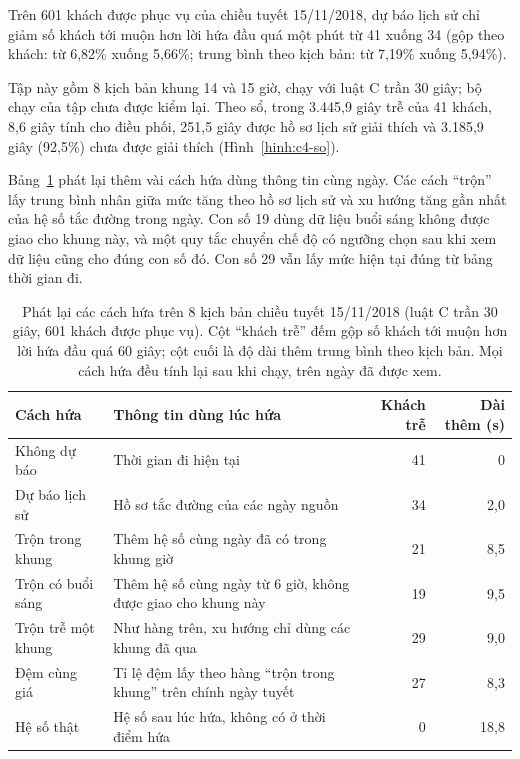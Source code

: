 Trên 601 khách được phục vụ của chiều tuyết 15/11/2018, dự báo lịch sử chỉ giảm số khách tới muộn hơn lời hứa đầu
quá một phút từ 41 xuống 34 (gộp theo khách: từ 6,82\% xuống 5,66\%; trung bình theo kịch bản: từ 7,19\% xuống
5,94\%).

Tập này gồm 8 kịch bản khung 14 và 15 giờ, chạy với luật C trần 30 giây; bộ chạy của tập chưa được kiểm lại. Theo
sổ, trong 3.445,9 giây trễ của 41 khách, 8,6 giây tính cho điều phối, 251,5 giây được hồ sơ lịch sử giải thích và
3.185,9 giây (92,5\%) chưa được giải thích (Hình~\ref{hinh:c4-so}).

Bảng~\ref{bang:c4-tuyet} phát lại thêm vài cách hứa dùng thông tin cùng ngày. Các cách ``trộn'' lấy trung bình
nhân giữa mức tăng theo hồ sơ lịch sử và xu hướng tăng gần nhất của hệ số tắc đường trong ngày. Con số 19 dùng dữ
liệu buổi sáng không được giao cho khung này, và một quy tắc chuyển chế độ có ngưỡng chọn sau khi xem dữ liệu cũng
cho đúng con số đó. Con số 29 vẫn lấy mức hiện tại đúng từ bảng thời gian đi.

\begin{table}[htbp]
\centering
\caption{Phát lại các cách hứa trên 8 kịch bản chiều tuyết 15/11/2018 (luật C trần 30 giây, 601 khách được phục
vụ). Cột ``khách trễ'' đếm gộp số khách tới muộn hơn lời hứa đầu quá 60 giây; cột cuối là độ dài thêm trung bình
theo kịch bản. Mọi cách hứa đều tính lại sau khi chạy, trên ngày đã được xem.}
\label{bang:c4-tuyet}
\small
\begin{tabular}{@{}p{3.6cm}p{7.0cm}rr@{}}
\toprule
\textbf{Cách hứa} & \textbf{Thông tin dùng lúc hứa} & \textbf{Khách trễ} & \textbf{Dài thêm (s)}\\
\midrule
Không dự báo & Thời gian đi hiện tại & 41 & 0\\
Dự báo lịch sử & Hồ sơ tắc đường của các ngày nguồn & 34 & 2,0\\
Trộn trong khung & Thêm hệ số cùng ngày đã có trong khung giờ & 21 & 8,5\\
Trộn có buổi sáng & Thêm hệ số cùng ngày từ 6 giờ, không được giao cho khung này & 19 & 9,5\\
Trộn trễ một khung & Như hàng trên, xu hướng chỉ dùng các khung đã qua & 29 & 9,0\\
Đệm cùng giá & Tỉ lệ đệm lấy theo hàng ``trộn trong khung'' trên chính ngày tuyết & 27 & 8,3\\
Hệ số thật & Hệ số sau lúc hứa, không có ở thời điểm hứa & 0 & 18,8\\
\bottomrule
\end{tabular}
\end{table}

